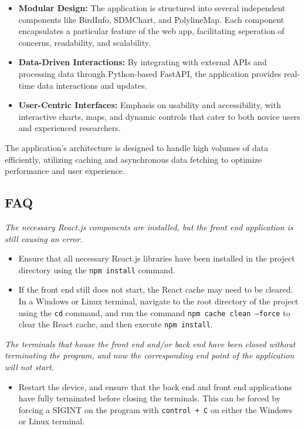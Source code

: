 \documentclass{article}
\begin{document}
\begin{itemize}
    \item \textbf{Modular Design:} The application is structured into several independent components like BirdInfo, SDMChart, and PolylineMap. Each component encapsulates a particular feature of the web app, facilitating seperation of concerns, readability, and scalability.
    \item \textbf{Data-Driven Interactions:} By integrating with external APIs and processing data through Python-based FastAPI, the application provides real-time data interactions and updates.
    \item \textbf{User-Centric Interfaces:} Emphasis on usability and accessibility, with interactive charts, maps, and dynamic controls that cater to both novice users and experienced researchers.
\end{itemize}

The application's architecture is designed to handle high volumes of data efficiently, utilizing caching and asynchronous data fetching to optimize performance and user experience.

\subsection{FAQ}

\noindent \textit{The necessary React.js components are installed, but the front end application is still causing an error.}

\begin{itemize}
    \item Ensure that all necessary React.js libraries have been installed in the project directory using the \texttt{npm install} command.
    \item If the front end still does not start, the React cache may need to be cleared. In a Windows or Linux terminal, navigate to the root directory of the project using the \texttt{cd} command, and run the command \texttt{npm cache clean --force} to clear the React cache, and then execute \texttt{npm install}.
\end{itemize}

\noindent \textit{The terminals that house the front end and/or back end have been closed without terminating the program, and now the corresponding end point of the application will not start.}

\begin{itemize}
    \item Restart the device, and ensure that the back end and front end applications have fully terminated before closing the terminals. This can be forced by forcing a SIGINT on the program with \texttt{control + C} on either the Windows or Linux terminal.
\end{itemize}
\end{document}
